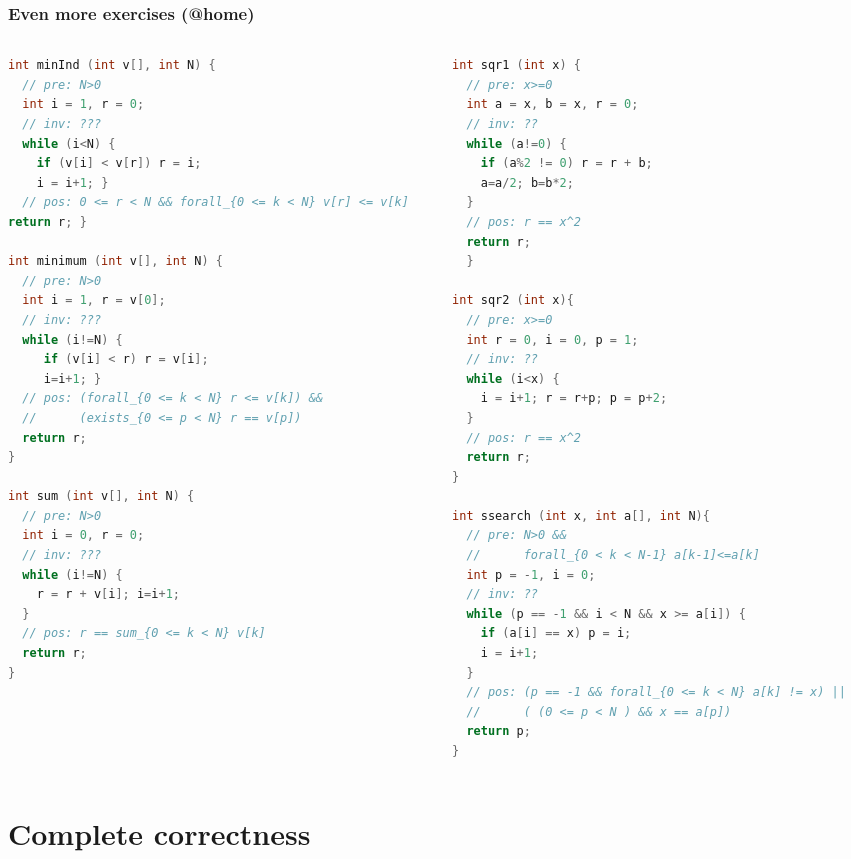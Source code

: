\documentclass[aspectratio=169]{beamer}
\begin{document}
\begin{frame}[fragile]\frametitle{Even more exercises (@home)}
\begin{columns}
\begin{column}{0.48\textwidth}
\begin{lstlisting}[language=C++,style=tiny]
int minInd (int v[], int N) {
  // pre: N>0
  int i = 1, r = 0;
  // inv: ???
  while (i<N) {
    if (v[i] < v[r]) r = i;
    i = i+1; }
  // pos: 0 <= r < N && forall_{0 <= k < N} v[r] <= v[k]
return r; }

int minimum (int v[], int N) {
  // pre: N>0
  int i = 1, r = v[0];
  // inv: ???
  while (i!=N) {
     if (v[i] < r) r = v[i];
     i=i+1; }
  // pos: (forall_{0 <= k < N} r <= v[k]) &&
  //      (exists_{0 <= p < N} r == v[p])
  return r;
}

int sum (int v[], int N) {
  // pre: N>0
  int i = 0, r = 0;
  // inv: ???
  while (i!=N) {
    r = r + v[i]; i=i+1;
  }
  // pos: r == sum_{0 <= k < N} v[k]
  return r;
}
\end{lstlisting}
\end{column}
\begin{column}{0.48\textwidth}
\begin{lstlisting}[language=C++,style=tiny]
int sqr1 (int x) {
  // pre: x>=0
  int a = x, b = x, r = 0;
  // inv: ??
  while (a!=0) {
    if (a%2 != 0) r = r + b;
    a=a/2; b=b*2;
  }
  // pos: r == x^2
  return r;
  }

int sqr2 (int x){
  // pre: x>=0
  int r = 0, i = 0, p = 1;
  // inv: ??
  while (i<x) {
    i = i+1; r = r+p; p = p+2;
  }
  // pos: r == x^2
  return r;
}

int ssearch (int x, int a[], int N){
  // pre: N>0 &&
  //      forall_{0 < k < N-1} a[k-1]<=a[k]
  int p = -1, i = 0;
  // inv: ??
  while (p == -1 && i < N && x >= a[i]) {
    if (a[i] == x) p = i;
    i = i+1;
  }
  // pos: (p == -1 && forall_{0 <= k < N} a[k] != x) ||
  //      ( (0 <= p < N ) && x == a[p])
  return p;
}
\end{lstlisting}
\end{column}
\end{columns}
\end{frame}


\section{Complete correctness}
\end{document}

